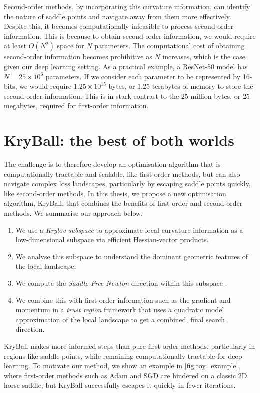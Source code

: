 Second-order methods, by incorporating this curvature information, can identify the nature of saddle points and navigate away from them more effectively. Despite this, it becomes computationally infeasible to process second-order information. This is because to obtain second-order information, we would require at least $O(N^2)$ space for $N$ parameters. The computational cost of obtaining second-order information becomes prohibitive as $N$ increases, which is the case given our deep learning setting. As a practical example, a ResNet-50 model has $N = 25 \times 10^6$ parameters. If we consider each parameter to be represented by 16-bits, we would require $1.25 \times 10^{15}$ bytes, or $1.25$ terabytes of memory to store the second-order information. This is in stark contrast to the $25$ million bytes, or $25$ megabytes, required for first-order information.

\section{KryBall: the best of both worlds}
\label{sec:kryball_intro}

The challenge is to therefore develop an optimisation algorithm that is computationally tractable and scalable, like first-order methods, but can also navigate complex loss landscapes, particularly by escaping saddle points quickly, like second-order methods. In this thesis, we propose a new optimisation algorithm, KryBall, that combines the benefits of first-order and second-order methods. We summarise our approach below.

\begin{enumerate}
  \item We use a \textit{Krylov subspace} to approximate local curvature information as a low-dimensional subspace via efficient Hessian-vector products.
  \item We analyse this subspace to understand the dominant geometric features of the local landscape. 
  \item We compute the \textit{Saddle-Free Newton} direction within this subspace \citep{dauphin2014sfn}.
  \item We combine this with first-order information such as the gradient and momentum in a \textit{trust region} framework that uses a quadratic model approximation of the local landscape to get a combined, final search direction.
\end{enumerate}

KryBall makes more informed steps than pure first-order methods, particularly in regions like saddle points, while remaining computationally tractable for deep learning. To motivate our method, we show an example in \cref{fig:toy_example}, where first-order methods such as Adam and SGD are hindered on a classic 2D horse saddle, but KryBall successfully escapes it quickly in fewer iterations.

